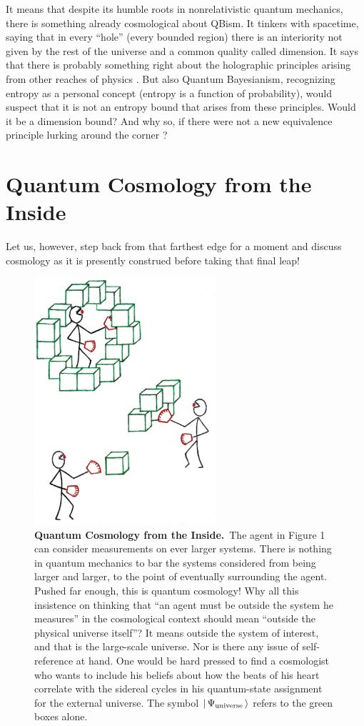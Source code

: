 It means that despite its humble roots in nonrelativistic quantum mechanics, there is something already cosmological about QBism.  It tinkers with spacetime, saying that in every ``hole'' (every bounded region) there is an interiority not given by the rest of the universe and a common quality called dimension.  It says that there is probably something right about the holographic principles arising from other reaches of physics \cite{Verlinde10}.  But also Quantum Bayesianism, recognizing entropy as a personal concept (entropy is a function of probability), would suspect that it is not an entropy bound that arises from these principles.  Would it be a dimension bound?  And why so, if there were not a new equivalence principle lurking around the corner \cite{Fuchs04b,Fuchs10b}?

\section{Quantum Cosmology from the Inside}

Let us, however, step back from that farthest edge for a moment and discuss cosmology as it is presently construed before taking that final leap!

\begin{figure}
\begin{center}
\includegraphics[height=3.6in]{cosmology.eps}
\bigskip\caption{\protect\small {\bf Quantum Cosmology from the Inside.}~The agent in Figure 1 can consider measurements on ever larger systems. There is nothing in quantum mechanics to bar the systems considered from being larger and larger, to the point of eventually surrounding the agent.  Pushed far enough, this is quantum cosmology!  Why all this insistence on thinking that ``an agent must be outside the system he measures'' in the cosmological context should mean ``outside the physical universe itself''?  It means outside the system of interest, and that is the large-scale universe. Nor is there any issue of self-reference at hand.  One would be hard pressed to find a cosmologist who wants to include his beliefs about how the beats of his heart correlate with the sidereal cycles in his quantum-state assignment for the external universe.  The symbol $|\,\Psi_{\rm \small universe}\,\rangle$ refers to the green boxes alone.}
\end{center}
\end{figure}

